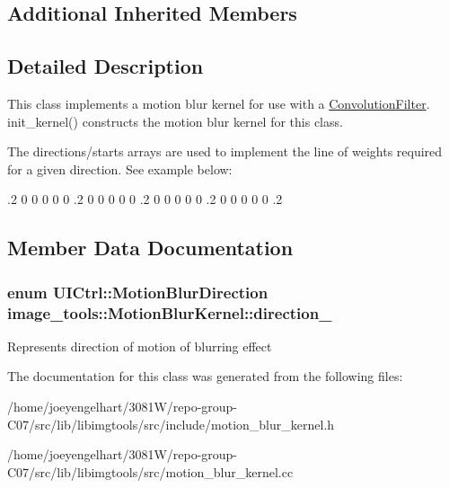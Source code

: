 \subsection*{Additional Inherited Members}


\subsection{Detailed Description}
This class implements a motion blur kernel for use with a \hyperlink{classimage__tools_1_1ConvolutionFilter}{Convolution\+Filter}. init\+\_\+kernel() constructs the motion blur kernel for this class. 

The directions/starts arrays are used to implement the line of weights required for a given direction. See example below\+:

.2 0 0 0 0 0 .2 0 0 0 0 0 .2 0 0 0 0 0 .2 0 0 0 0 0 .2 

\subsection{Member Data Documentation}
\subsubsection[{\texorpdfstring{direction\+\_\+}{direction_}}]{\setlength{\rightskip}{0pt plus 5cm}enum {\bf U\+I\+Ctrl\+::\+Motion\+Blur\+Direction} image\+\_\+tools\+::\+Motion\+Blur\+Kernel\+::direction\+\_\+\hspace{0.3cm}{\ttfamily [private]}}\hypertarget{classimage__tools_1_1MotionBlurKernel_ae10c96d114f1320d1158842ba452ef96}{}\label{classimage__tools_1_1MotionBlurKernel_ae10c96d114f1320d1158842ba452ef96}
Represents direction of motion of blurring effect 

The documentation for this class was generated from the following files\+:\begin{DoxyCompactItemize}
\item 
/home/joeyengelhart/3081\+W/repo-\/group-\/\+C07/src/lib/libimgtools/src/include/motion\+\_\+blur\+\_\+kernel.\+h\item 
/home/joeyengelhart/3081\+W/repo-\/group-\/\+C07/src/lib/libimgtools/src/motion\+\_\+blur\+\_\+kernel.\+cc\end{DoxyCompactItemize}
